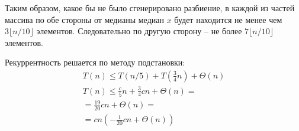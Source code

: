 \documentclass[11pt]{article}
\begin{document}
Таким образом, какое бы не было сгенерировано разбиение, в каждой из частей массива по обе стороны от медианы медиан $x$ будет находится не менее чем $3 \lfloor n/10 \rfloor$ элементов. Следовательно по другую сторону -- не более $7 \lfloor n/10 \rfloor$ элементов. 

Рекуррентность решается по методу подстановки:
\begin{align*}
  T(n) \leqslant T(n/5) + T(\frac{3}{4}n) + \Theta(n) \\
  T(n) \leqslant \frac{c}{5}n + \frac{3}{4}cn + \Theta(n) = \\
  = \frac{19}{20}cn + \Theta(n) = \\
  = cn (-\frac{1}{20}cn + \Theta(n))
\end{align*}
\end{document}
